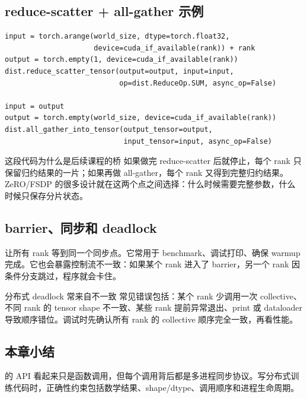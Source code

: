 \subsection{reduce-scatter + all-gather 示例}

\begin{lstlisting}[caption={reduce-scatter 后接 all-gather 复原 all-reduce 语义}]
input = torch.arange(world_size, dtype=torch.float32,
                     device=cuda_if_available(rank)) + rank
output = torch.empty(1, device=cuda_if_available(rank))
dist.reduce_scatter_tensor(output=output, input=input,
                           op=dist.ReduceOp.SUM, async_op=False)

input = output
output = torch.empty(world_size, device=cuda_if_available(rank))
dist.all_gather_into_tensor(output_tensor=output,
                            input_tensor=input, async_op=False)
\end{lstlisting}

\begin{importantbox}{这段代码为什么是后续课程的桥}
如果做完 reduce-scatter 后就停止，每个 rank 只保留归约结果的一片；如果再做 all-gather，每个 rank 又得到完整归约结果。ZeRO/FSDP 的很多设计就在这两个点之间选择：什么时候需要完整参数，什么时候只保存分片状态。
\end{importantbox}

\subsection{barrier、同步和 deadlock}

 让所有 rank 等到同一个同步点。它常用于 benchmark、调试打印、确保 warmup 完成。它也会暴露控制流不一致：如果某个 rank 进入了 barrier，另一个 rank 因条件分支跳过，程序就会卡住。

\begin{warningbox}{分布式 deadlock 常来自不一致}
常见错误包括：某个 rank 少调用一次 collective、不同 rank 的 tensor shape 不一致、某些 rank 提前异常退出、print 或 dataloader 导致顺序错位。调试时先确认所有 rank 的 collective 顺序完全一致，再看性能。
\end{warningbox}

\subsection{本章小结}

 的 API 看起来只是函数调用，但每个调用背后都是多进程同步协议。写分布式训练代码时，正确性约束包括数学结果、shape/dtype、调用顺序和进程生命周期。

